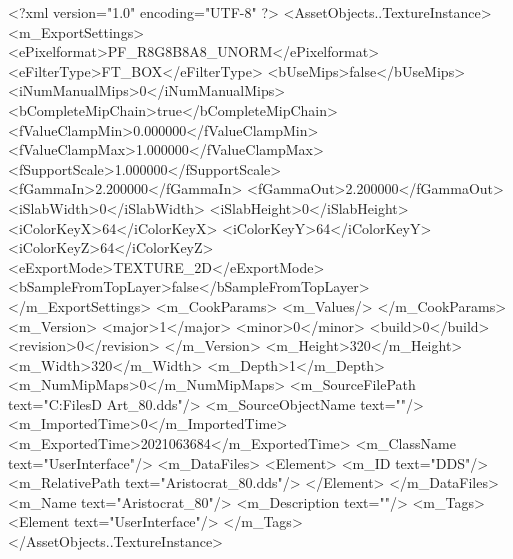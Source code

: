 <?xml version="1.0" encoding="UTF-8" ?>
<AssetObjects..TextureInstance>
	<m_ExportSettings>
		<ePixelformat>PF_R8G8B8A8_UNORM</ePixelformat>
		<eFilterType>FT_BOX</eFilterType>
		<bUseMips>false</bUseMips>
		<iNumManualMips>0</iNumManualMips>
		<bCompleteMipChain>true</bCompleteMipChain>
		<fValueClampMin>0.000000</fValueClampMin>
		<fValueClampMax>1.000000</fValueClampMax>
		<fSupportScale>1.000000</fSupportScale>
		<fGammaIn>2.200000</fGammaIn>
		<fGammaOut>2.200000</fGammaOut>
		<iSlabWidth>0</iSlabWidth>
		<iSlabHeight>0</iSlabHeight>
		<iColorKeyX>64</iColorKeyX>
		<iColorKeyY>64</iColorKeyY>
		<iColorKeyZ>64</iColorKeyZ>
		<eExportMode>TEXTURE_2D</eExportMode>
		<bSampleFromTopLayer>false</bSampleFromTopLayer>
	</m_ExportSettings>
	<m_CookParams>
		<m_Values/>
	</m_CookParams>
	<m_Version>
		<major>1</major>
		<minor>0</minor>
		<build>0</build>
		<revision>0</revision>
	</m_Version>
	<m_Height>320</m_Height>
	<m_Width>320</m_Width>
	<m_Depth>1</m_Depth>
	<m_NumMipMaps>0</m_NumMipMaps>
	<m_SourceFilePath text="C:\Users\Shadow\Desktop\Working Files\2D Art\Quarters\Aristocrat\Aristocrat_80.dds"/>
	<m_SourceObjectName text=""/>
	<m_ImportedTime>0</m_ImportedTime>
	<m_ExportedTime>2021063684</m_ExportedTime>
	<m_ClassName text="UserInterface"/>
	<m_DataFiles>
		<Element>
			<m_ID text="DDS"/>
			<m_RelativePath text="Aristocrat_80.dds"/>
		</Element>
	</m_DataFiles>
	<m_Name text="Aristocrat_80"/>
	<m_Description text=""/>
	<m_Tags>
		<Element text="UserInterface"/>
	</m_Tags>
</AssetObjects..TextureInstance>


